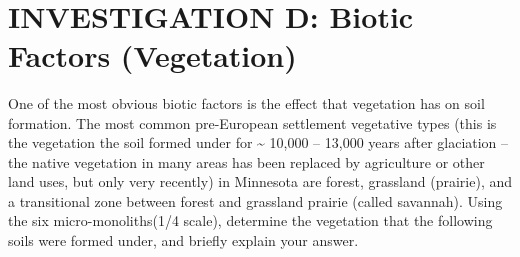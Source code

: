 \documentclass[
  letterpaper,
  twocolumn,
  portrait]{scrbook}
\begin{document}
~ ~ ~ ~ ~

\hypertarget{investigation-d-biotic-factors-vegetation}{%
\section{INVESTIGATION D: Biotic Factors
(Vegetation)}\label{investigation-d-biotic-factors-vegetation}}

One of the most obvious biotic factors is the effect that vegetation has
on soil formation. The most common pre-European settlement vegetative
types (this is the vegetation the soil formed under for
\textasciitilde{} 10,000 -- 13,000 years after glaciation -- the native
vegetation in many areas has been replaced by agriculture or other land
uses, but only very recently) in Minnesota are forest, grassland
(prairie), and a transitional zone between forest and grassland prairie
(called savannah). Using the six micro-monoliths(1/4 scale), determine
the vegetation that the following soils were formed under, and briefly
explain your answer.

 
  \providecommand{\huxb}[2]{\arrayrulecolor[RGB]{#1}\global\arrayrulewidth=#2pt}
  \providecommand{\huxvb}[2]{\color[RGB]{#1}\vrule width #2pt}
  \providecommand{\huxtpad}[1]{\rule{0pt}{#1}}
  \providecommand{\huxbpad}[1]{\rule[-#1]{0pt}{#1}}
\end{document}
